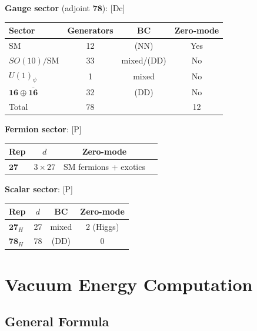 \documentclass[11pt,a4paper]{article}
\newcommand{\tagDc}{\textcolor{blue!50!black}{[Dc]}}
\newcommand{\tagP}{\textcolor{green!50!black}{[P]}}
\begin{document}
\begin{trackbox}
\textbf{Gauge sector} (adjoint $\mathbf{78}$): \tagDc
\begin{center}
\begin{tabular}{lccc}
\toprule
Sector & Generators & BC & Zero-mode \\
\midrule
SM & 12 & (NN) & Yes \\
$SO(10)/\text{SM}$ & 33 & mixed/(DD) & No \\
$U(1)_\psi$ & 1 & mixed & No \\
$\mathbf{16} \oplus \bar{\mathbf{16}}$ & 32 & (DD) & No \\
\midrule
Total & 78 & & 12 \\
\bottomrule
\end{tabular}
\end{center}

\textbf{Fermion sector}: \tagP
\begin{center}
\begin{tabular}{lccc}
\toprule
Rep & $d$ & Zero-mode \\
\midrule
$\mathbf{27}$ & $3 \times 27$ & SM fermions + exotics \\
\bottomrule
\end{tabular}
\end{center}

\textbf{Scalar sector}: \tagP
\begin{center}
\begin{tabular}{lccc}
\toprule
Rep & $d$ & BC & Zero-mode \\
\midrule
$\mathbf{27}_H$ & 27 & mixed & 2 (Higgs) \\
$\mathbf{78}_H$ & 78 & (DD) & 0 \\
\bottomrule
\end{tabular}
\end{center}

\end{trackbox}

\section{Vacuum Energy Computation}

\subsection{General Formula}
\end{document}
